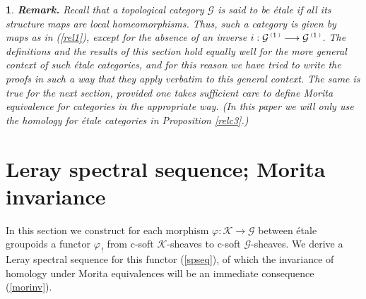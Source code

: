 \documentclass[a4paper]{article}
\newtheorem{num}[st]{}
\newcommand{\f}{\ensuremath{\varphi}}
\newcommand{\rmap}{\longrightarrow}
\newcommand{\Ka}{\ensuremath{\mathcal{K}}}
\newcommand{\G}{\ensuremath{\mathcal{G}}}
\newcommand{\ps}{{\raise 1pt\hbox{\tiny (}}}
\newcommand{\pd}{{\raise 1pt\hbox{\tiny )}}}
\newcommand{\nG}[1]{\ensuremath{\G^{\,\ps #1\,\pd}}}
\begin{document}
\begin{num}
\label{etalecate}
\emph{
{\bf Remark.} Recall that a topological category $\G$ is said to be \'etale if all its structure maps are local homeomorphisms. Thus, such a category is given by maps as in (\ref{rel1}), except for the absence of an inverse $i:\nG{1}\rmap\nG{1}$. The definitions and the results of this section hold equally well for the more general context of such \'etale categories, and for this reason we have tried to write the proofs in such a way that they apply verbatim to this general context. The same is true for the next section, provided one takes sufficient care to define Morita equivalence for categories in the appropriate way. (In this paper we will only use the homology for \'etale categories in Proposition \ref{relc3}.) }
\end{num}


\section{Leray spectral sequence; Morita invariance}


\hspace*{.3in} In this section we construct for each morphism $\f: \Ka \rmap \G$ between \'etale groupoids a functor $\f_{\, !}$ from c-soft $\Ka$-sheaves to c-soft $\G$-sheaves. We derive a Leray spectral sequence for this functor (\ref{spseq}), of which the invariance of homology under Morita equivalences will be an immediate consequence (\ref{morinv}).
\end{document}
